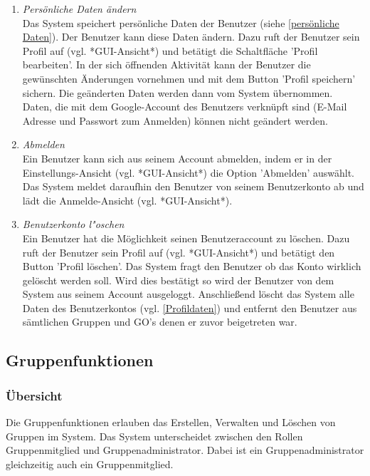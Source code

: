 \documentclass[parskip=full]{scrartcl}
\def\threedigits#1{%
  \ifnum#1<100 0\fi
  \ifnum#1<10 0\fi
  \number#1}
\begin{document}
\begin{enumerate}[label={\textbf{/F\protect\threedigits{\theenumi}0/}}, leftmargin=*]
	\item \colorbox{shadecolor}{\textit{Persönliche Daten ändern}\label{Persönliche Daten ändern}} \\ Das System speichert persönliche Daten der Benutzer (siehe  \ref{persönliche Daten}). Der Benutzer kann diese Daten ändern. Dazu ruft der Benutzer sein Profil auf (vgl. *GUI-Ansicht*) und betätigt die Schaltfläche 'Profil bearbeiten'. In der sich öffnenden Aktivität kann der Benutzer die gewünschten Änderungen vornehmen und mit dem Button 'Profil speichern' sichern. Die geänderten Daten werden dann vom System übernommen.\\
Daten, die mit dem Google-Account des Benutzers verknüpft sind (E-Mail Adresse und Passwort zum Anmelden) können nicht geändert werden.
	
	\item \textit{Abmelden}\label{Abmelden} \\ Ein Benutzer kann sich aus seinem Account abmelden, indem er in der Einstellungs-Ansicht (vgl. *GUI-Ansicht*) die Option 'Abmelden' auswählt. Das System meldet daraufhin den Benutzer von seinem Benutzerkonto ab und lädt die Anmelde-Ansicht (vgl. *GUI-Ansicht*).
	
	\item \textit{Benutzerkonto l"oschen}\label{Benutzerkonto löschen}\\
	Ein Benutzer hat die Möglichkeit seinen Benutzeraccount zu löschen. Dazu ruft der Benutzer sein Profil auf (vgl. *GUI-Ansicht*) und betätigt den Button 'Profil löschen'. Das System fragt den Benutzer ob das Konto wirklich gelöscht werden soll. Wird dies bestätigt so wird der Benutzer von dem System aus seinem Account ausgeloggt. Anschließend löscht das System alle Daten des Benutzerkontos (vgl. \ref{Profildaten}) und entfernt den Benutzer aus sämtlichen Gruppen und GO's denen er zuvor beigetreten war.
\end{enumerate}

\subsection{Gruppenfunktionen}

\subsubsection{Übersicht}
Die Gruppenfunktionen erlauben das Erstellen, Verwalten und Löschen von Gruppen im System. Das System unterscheidet zwischen den Rollen Gruppenmitglied und Gruppenadministrator. Dabei ist ein Gruppenadministrator gleichzeitig auch ein Gruppenmitglied.
\end{document}
